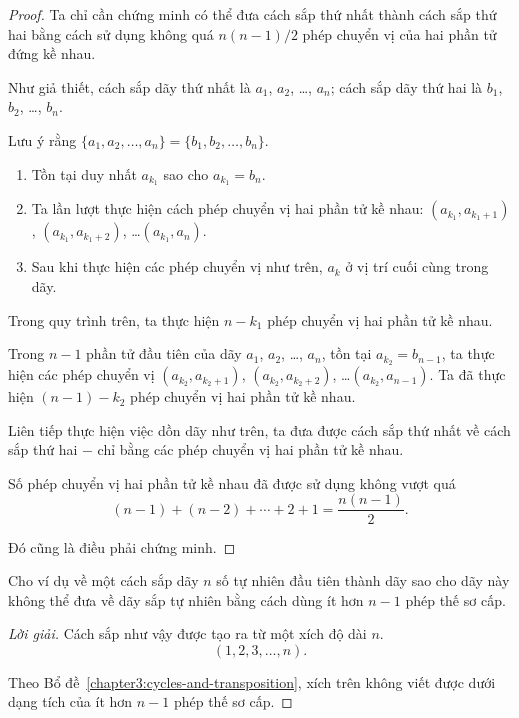\begin{proof}
    Ta chỉ cần chứng minh có thể đưa cách sắp thứ nhất thành cách sắp thứ hai bằng cách sử dụng không quá $n(n-1)/2$ phép chuyển vị của hai phần tử đứng kề nhau.
    
    Như giả thiết, cách sắp dãy thứ nhất là $a_{1}$, $a_{2}$, \ldots, $a_{n}$; cách sắp dãy thứ hai là $b_{1}$, $b_{2}$, \ldots, $b_{n}$.
    
    Lưu ý rằng $\{ a_{1}, a_{2}, \ldots, a_{n} \} = \{ b_{1}, b_{2}, \ldots, b_{n} \}$.

    \begin{enumerate}[label={(\arabic*)}]
        \item Tồn tại duy nhất $a_{k_{1}}$ sao cho $a_{k_{1}} = b_{n}$.
        \item Ta lần lượt thực hiện cách phép chuyển vị hai phần tử kề nhau: $(a_{k_{1}}, a_{k_{1}+1})$, $(a_{k_{1}}, a_{k_{1}+2})$, \ldots $(a_{k_{1}}, a_{n})$.
        \item Sau khi thực hiện các phép chuyển vị như trên, $a_{k}$ ở vị trí cuối cùng trong dãy.
    \end{enumerate}
    
    Trong quy trình trên, ta thực hiện $n - k_{1}$ phép chuyển vị hai phần tử kề nhau.
    
    Trong $n - 1$ phần tử đầu tiên của dãy $a_{1}$, $a_{2}$, \ldots, $a_{n}$, tồn tại $a_{k_{2}} = b_{n-1}$,  ta thực hiện các phép chuyển vị $(a_{k_{2}}, a_{k_{2}+1})$, $(a_{k_{2}}, a_{k_{2}+2})$, \ldots $(a_{k_{2}}, a_{n-1})$. Ta đã thực hiện $(n - 1) - k_{2}$ phép chuyển vị hai phần tử kề nhau.
    
    Liên tiếp thực hiện việc dồn dãy như trên, ta đưa được cách sắp thứ nhất về cách sắp thứ hai $-$ chỉ bằng các phép chuyển vị hai phần tử kề nhau.
    
    Số phép chuyển vị hai phần tử kề nhau đã được sử dụng không vượt quá
    \[
        (n - 1) + (n - 2) + \cdots + 2 + 1 = \dfrac{n(n-1)}{2}.
    \]
    
    Đó cũng là điều phải chứng minh.
\end{proof}

\begin{exercise}
    Cho ví dụ về một cách sắp dãy $n$ số tự nhiên đầu tiên thành dãy sao cho dãy này không thể đưa về dãy sắp tự nhiên bằng cách dùng ít hơn $n - 1$ phép thế sơ cấp.
\end{exercise}

\begin{proof}[Lời giải]
    Cách sắp như vậy được tạo ra từ một xích độ dài $n$.
    \[
        (1, 2, 3, \ldots, n).
    \]

    Theo Bổ đề~\ref{chapter3:cycles-and-transposition}, xích trên không viết được dưới dạng tích của ít hơn $n - 1$ phép thế sơ cấp.
\end{proof}

